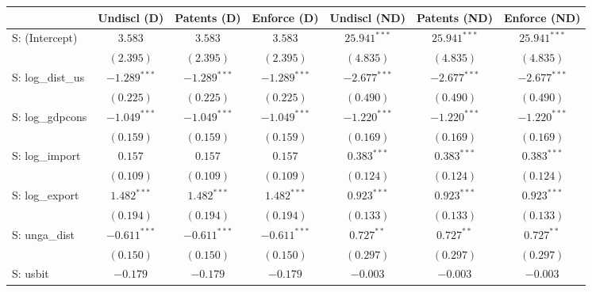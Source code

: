 
\begin{table}
\begin{center}
\begin{tabular}{l c c c c c c}
\hline
 & Undiscl (D) & Patents (D) & Enforce (D) & Undiscl (ND) & Patents (ND) & Enforce (ND) \\
\hline
S: (Intercept)                & $3.583$        & $3.583$        & $3.583$        & $25.941^{***}$ & $25.941^{***}$ & $25.941^{***}$  \\
                              & $(2.395)$      & $(2.395)$      & $(2.395)$      & $(4.835)$      & $(4.835)$      & $(4.835)$       \\
S: log\_dist\_us              & $-1.289^{***}$ & $-1.289^{***}$ & $-1.289^{***}$ & $-2.677^{***}$ & $-2.677^{***}$ & $-2.677^{***}$  \\
                              & $(0.225)$      & $(0.225)$      & $(0.225)$      & $(0.490)$      & $(0.490)$      & $(0.490)$       \\
S: log\_gdpcons               & $-1.049^{***}$ & $-1.049^{***}$ & $-1.049^{***}$ & $-1.220^{***}$ & $-1.220^{***}$ & $-1.220^{***}$  \\
                              & $(0.159)$      & $(0.159)$      & $(0.159)$      & $(0.169)$      & $(0.169)$      & $(0.169)$       \\
S: log\_import                & $0.157$        & $0.157$        & $0.157$        & $0.383^{***}$  & $0.383^{***}$  & $0.383^{***}$   \\
                              & $(0.109)$      & $(0.109)$      & $(0.109)$      & $(0.124)$      & $(0.124)$      & $(0.124)$       \\
S: log\_export                & $1.482^{***}$  & $1.482^{***}$  & $1.482^{***}$  & $0.923^{***}$  & $0.923^{***}$  & $0.923^{***}$   \\
                              & $(0.194)$      & $(0.194)$      & $(0.194)$      & $(0.133)$      & $(0.133)$      & $(0.133)$       \\
S: unga\_dist                 & $-0.611^{***}$ & $-0.611^{***}$ & $-0.611^{***}$ & $0.727^{**}$   & $0.727^{**}$   & $0.727^{**}$    \\
                              & $(0.150)$      & $(0.150)$      & $(0.150)$      & $(0.297)$      & $(0.297)$      & $(0.297)$       \\
S: usbit                      & $-0.179$       & $-0.179$       & $-0.179$       & $-0.003$       & $-0.003$       & $-0.003$        \\

\end{tabular}
\end{center}
\end{table}
